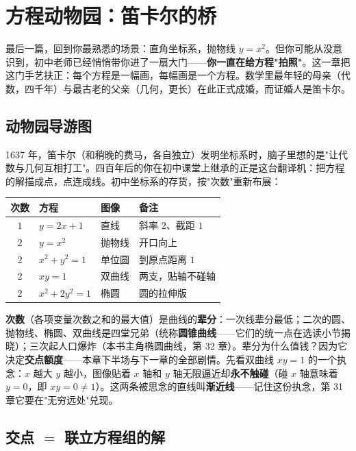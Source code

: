 \chapter{方程动物园：笛卡尔的桥}

最后一篇，回到你最熟悉的场景：直角坐标系，抛物线 $y = x^2$。但你可能从没意识到，初中老师已经悄悄带你进了一扇大门——\textbf{你一直在给方程"拍照"}。这一章把这门手艺扶正：每个方程是一幅画，每幅画是一个方程。数学里最年轻的母亲（代数，四千年）与最古老的父亲（几何，更长）在此正式成婚，而证婚人是笛卡尔。

\section{动物园导游图}

1637 年，笛卡尔（和稍晚的费马，各自独立）发明坐标系时，脑子里想的是"让代数与几何互相打工"。四百年后的你在初中课堂上继承的正是这台翻译机：把方程的解描成点，点连成线。初中坐标系的存货，按"次数"重新布展：

\begin{center}
\begin{tabular}{clll}
\toprule
次数 & 方程 & 图像 & 备注 \\
\midrule
$1$ & $y = 2x + 1$ & 直线 & 斜率 $2$、截距 $1$ \\
$2$ & $y = x^2$ & 抛物线 & 开口向上 \\
$2$ & $x^2 + y^2 = 1$ & 单位圆 & 到原点距离 $1$ \\
$2$ & $xy = 1$ & 双曲线 & 两支，贴轴不碰轴 \\
$2$ & $x^2 + 2y^2 = 1$ & 椭圆 & 圆的拉伸版 \\
\bottomrule
\end{tabular}
\end{center}

\textbf{次数}（各项变量次数之和的最大值）是曲线的\textbf{辈分}：一次线辈分最低；二次的圆、抛物线、椭圆、双曲线是四堂兄弟（统称\textbf{圆锥曲线}——它们的统一点在选读小节揭晓）；三次起人口爆炸（本书主角椭圆曲线，第 32 章）。辈分为什么值钱？因为它决定\textbf{交点额度}——本章下半场与下一章的全部剧情。先看双曲线 $xy = 1$ 的一个执念：$x$ 越大 $y$ 越小，图像贴着 $x$ 轴和 $y$ 轴无限逼近却\textbf{永不触碰}（碰 $x$ 轴意味着 $y = 0$，即 $xy = 0 \ne 1$）。这两条被思念的直线叫\textbf{渐近线}——记住这份执念，第 31 章它要在"无穷远处"兑现。

\section{交点 $=$ 联立方程组的解}

